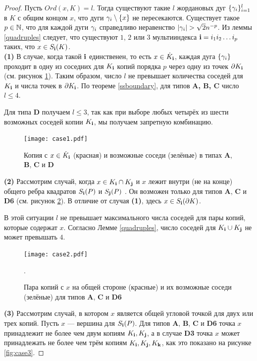 \begin{proof}\label{proof:point_branching}
Пусть $Ord(x,K)=l$.
Тогда существуют такие $l$ жордановых дуг $\{\gamma_i\}_{i=1}^l$ в $K$ с общим концом $x$, что дуги $\gamma_i\setminus \{x\}$ не пересекаются.
Существует такое $p\in\mathbb{N}$, что для каждой дуги $\gamma_i$ справедливо неравенство $|\ga_i|>\sqrt{2}n^{-p}$.
Из леммы \ref{quadruples} следует, что существуют $1$, $2$ или $3$ мультииндекса ${\bf{i}}=i_1i_2\ldots i_p$ таких, что $x\in S_{\bf{i}}(K)$.\\

\textbf{(1)} В случае, когда такой ${\bf{i}}$ единственен, то есть $x\in \dot K_{\bf{i}}$, каждая дуга $\{\gamma_i\}$ проходит в одну из соседних для $K_{\bf{i}}$ копий порядка $p$ через одну из точек $\partial K_{\bf{i}}$ (см. рисунок \ref{fig:case1}). 
Таким образом, число $l$ не превышает количества соседей для $K_{\bf{i}}$  и числа точек в $\partial K_{\bf{i}}$. 
По теореме \ref{ssboundary}, для типов {\bf A, B, C} число $l\leq 4$.

Для типа {\bf D} получаем $l\le 3$, так как при выборе любых четырёх из шести возможных соседей копии $K_{\bf{i}}$, мы получаем запретную комбинацию.

\begin{figure}[H]
\centering
\texttt{[image: case1.pdf]}
\caption{Копия с $x\in\dot K_{\bf{i}}$ (красная) и возможные соседи (зелёные) в типах \textbf{A}, \textbf{B}, \textbf{C} и \textbf{D}}
\label{fig:case1}
\end{figure}

\textbf{(2)} Рассмотрим случай, когда $x\in K_{\bf{i}}\cap K_{\bf{j}}$ и $x$ лежит внутри (не на конце) общего ребра квадратов $S_{\bf{i}}(P)$ и $S_{\bf{j}}(P)$ .
Он возможен только для типов \textbf{A}, \textbf{C} и \textbf{D6} (см. рисунок \ref{fig:case2}).
В отличие от случая \textbf{(1)}, здесь $x\in S_{\bf{i}}(\partial K)$.

В этой ситуации $l$ не превышает максимального числа соседей для пары копий, которые содержат $x$.
Согласно Лемме \ref{quadruples}, число соседей для $K_{\bf{i}}\cup K_{\bf{j}}$ не может превышать $4$.

\begin{figure}[H]
\centering
\texttt{[image: case2.pdf]}
\caption{Пара копий с $x$ на общей стороне (красные) и их возможные соседи (зелёные) для типов \textbf{A}, \textbf{C} и \textbf{D6}}. 
\label{fig:case2}
\end{figure}

\textbf{(3)} Рассмотрим случай, в котором $x$ является общей угловой точкой для двух или трех копий.
Пусть $x$ --- вершина для $S_{\bf{i}}(P)$.
Для типов \textbf{A},  \textbf{B}, \textbf{C} и \textbf{D6} точка $x$ принадлежит не более чем двум копиям $K_{\bf{i}}, K_{\bf{j}}$, а в случае \textbf{D3} точка $x$ может принадлежать не более чем трём копиям $K_{\bf{i}}, K_{\bf{j}}, K_{\bf{k}}$, как это показано на рисунке \ref{fig:case3}.


\end{proof}
